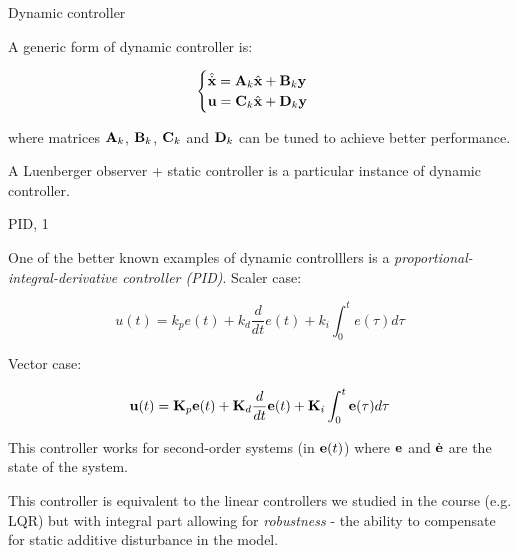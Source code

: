 \documentclass{beamer}
\begin{document}
\begin{frame}{Dynamic controller}
	\begin{flushleft}
		
		A generic form of dynamic controller is:
		
		\begin{equation}
			\begin{cases}
				\hat{\dot {\mathbf{x}}} = \mathbf{A}_k \hat{\mathbf{x}} + \mathbf{B}_k \mathbf{y}
				\\
				\mathbf{u} = \mathbf{C}_k \hat{\mathbf{x}} + \mathbf{D}_k \mathbf{y}
			\end{cases}
		\end{equation}
		
		where matrices $\mathbf{A}_k$, $\mathbf{B}_k$, $\mathbf{C}_k$ and $\mathbf{D}_k$ can be tuned to achieve better performance.
		
		\bigskip
		
		A Luenberger observer + static controller is a particular instance of dynamic controller.
		
	\end{flushleft}
\end{frame}



\begin{frame}{PID, 1}
	\begin{flushleft}
		
		One of the better known examples of dynamic controlllers is a \emph{proportional-integral-derivative controller (PID)}. Scaler case:
		
		\begin{equation}
			u(t) = k_p e(t) + k_d \frac{d}{dt} e(t) + k_i \int_{0}^{t} e(\tau) d \tau
		\end{equation}
		
		Vector case:
		
		\begin{equation}
			\mathbf{u}(t) = \mathbf{K}_p \mathbf{e}(t) + \mathbf{K}_d \frac{d}{dt} \mathbf{e}(t) + \mathbf{K}_i \int_{0}^{t} \mathbf{e}(\tau) d \tau
		\end{equation}
		
		This controller works for second-order systems (in $\mathbf{e}(t)$) where $\mathbf{e}$ and $\dot{\mathbf{e}}$ are the state of the system.
		
		\bigskip
		
		This controller is equivalent to the linear controllers we studied in the course (e.g. LQR) but with integral part allowing for \emph{robustness} - the ability to compensate for static additive disturbance in the model.
		
	\end{flushleft}
\end{frame}
\end{document}
